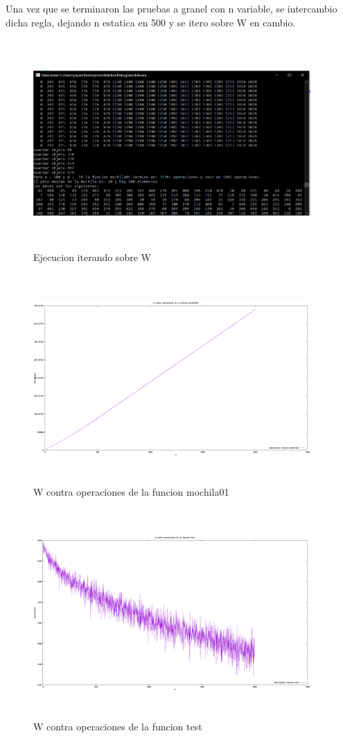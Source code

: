 \documentclass[spanish]{article}
\begin{document}
 		Una vez que se terminaron las pruebas a granel con n variable, se intercambio dicha regla, dejando n estatica en 500 y se itero sobre W en cambio.\\
 		\begin{figure}[H]
 			\centering
 			\includegraphics[width=400px,height=300px]{captura3}
 			\caption{Ejecucion iterando sobre W}
	 	\end{figure}
	 	\begin{figure}[H]
	 		\centering
	 		\includegraphics[width=400px,height=300px]{grafica8}
	 		\caption{W contra operaciones de la funcion mochila01}
	 	\end{figure}
	 	\begin{figure}[H]
	 		\centering
	 		\includegraphics[width=400px,height=300px]{grafica9}
	 		\caption{W contra operaciones de la funcion test}
	 	\end{figure}
\end{document}
